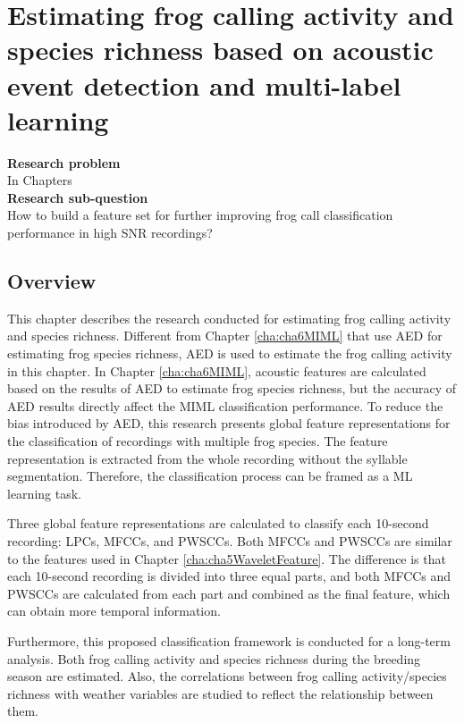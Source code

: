 
\chapter{Estimating frog calling activity and species richness based on acoustic event detection and multi-label learning}
\label{cha:cha7ML}
\textbf{Research problem}
\\
In Chapters 
\\
\textbf{Research sub-question}
\\
How to build a feature set for further improving frog call classification performance in high SNR recordings?


\section{Overview}
\label{sect:introduction}

This chapter describes the research conducted for estimating frog calling activity and species richness. Different from Chapter \ref{cha:cha6MIML} that use AED for estimating frog species richness, AED is used to estimate the frog calling activity in this chapter.
In Chapter \ref{cha:cha6MIML}, acoustic features are calculated based on the results of AED to estimate frog species richness, but the accuracy of AED results directly affect the MIML classification performance.
To reduce the bias introduced by AED, this research presents global feature representations for the classification of recordings with multiple frog species. The feature representation is extracted from the whole recording without the syllable segmentation. Therefore, the classification process can be framed as a ML learning task.  



Three global feature representations are calculated to classify each 10-second recording: LPCs, MFCCs, and PWSCCs. Both MFCCs and PWSCCs are similar to the features used in Chapter \ref{cha:cha5WaveletFeature}. The difference is that each 10-second recording is divided into three equal parts, and both MFCCs and PWSCCs are calculated from each part and combined as the final feature, which can obtain more temporal information.


Furthermore, this proposed classification framework is conducted for a long-term analysis. Both frog calling activity and species richness during the breeding season are estimated. Also, the correlations between frog calling activity/species richness with weather variables are studied to reflect the relationship between them. 

